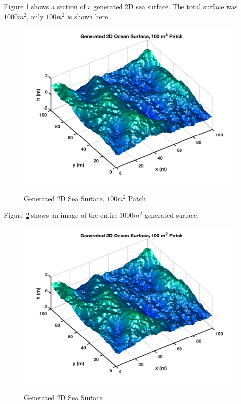Figure \ref{os_fig:8} shows a section of a generated 2D sea surface. The total surface was $1000 m^2$, only $100 m^2$ is shown here.
\begin{figure}[H]
  \begin{center}
\includegraphics[width=6in]{../media/Ocean_Surface/sea_surface_2d_surf.png}
  \end{center}
  \renewcommand{\baselinestretch}{1} \small\normalsize
  \begin{quote}
    \caption[Generated 2D Sea Surface, $100 m^2$ Patch]{Generated 2D Sea Surface, $100 m^2$ Patch \label{os_fig:8}}
  \end{quote}
\end{figure}
\renewcommand{\baselinestretch}{2} \small\normalsize

Figure \ref{os_fig:9} shows an image of the entire $1000 m^2$ generated surface.
\begin{figure}[H]
  \begin{center}
\includegraphics[width=6in]{../media/Ocean_Surface/sea_surface_2d_image.png}
  \end{center}
  \renewcommand{\baselinestretch}{1} \small\normalsize
  \begin{quote}
    \caption[Generated 2D Sea Surface]{Generated 2D Sea Surface\label{os_fig:9}}
  \end{quote}
\end{figure}
\renewcommand{\baselinestretch}{2} \small\normalsize

